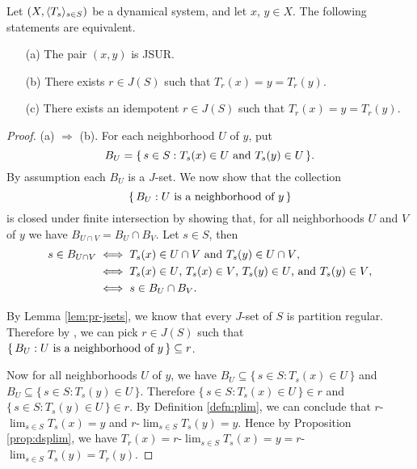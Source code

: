   \begin{lem}
    \label{lem:JSUR}
    Let $(X, \langle T_s \rangle_{s \in S})$ be a dynamical system, and let $x$, $y \in X$.
    The following statements are equivalent.
    \begin{itemize}
      \item[(a)] The pair $(x, y)$ is JSUR.
      \item[(b)] There exists $r \in J(S)$ such that $T_r(x) = y = T_r(y)$.
      \item[(c)] There exists an idempotent $r \in J(S)$ such that $T_r(x)
        = y = T_r(y)$. 
    \end{itemize}
  \end{lem}
  \begin{proof}
    (a) $\Rightarrow$ (b). 
    For each neighborhood $U$ of $y$, put 
      \[  
        B_U = \{\, s \in S : \hbox{$T_s(x) \in U$ and $T_s(y) \in U$}
        \,\}.
      \]
    By assumption each $B_U$ is a $J$-set. 
    We now show that the collection 
    \[
      \{\, B_U : \hbox{$U$ is a neighborhood of $y$} \,\}
    \] 
    is closed under finite intersection
    by showing that, for all neighborhoods $U$ and $V$ of $y$ we have $B_{U
      \cap V} = B_U \cap B_V$.
    Let $s \in S$, then 
      \begin{align*}
        s \in B_{U \cap V} &\iff \hbox{$T_s(x) \in U \cap V$ and $T_s(y) \in U
        \cap V$}, \\
      &\iff \hbox{$T_s(x) \in U$, $T_s(x) \in V$, $T_s(y) \in U$, and
        $T_s(y) \in V$}, \\
      &\iff s \in B_U \cap B_V.
      \end{align*}
    
    By Lemma \ref{lem:pr-jsets}, we know that every $J$-set
    of $S$ is partition regular. 
    Therefore by \cite[Theorem 3.11 (b)]{Hindman:1998fk},  we can pick 
    $r \in J(S)$ such that $\{\, B_U : \hbox{$U$ is a neighborhood of
      $y$}\,\} \subseteq r$. 
    
    Now for all neighborhoods $U$ of $y$, we have $B_U \subseteq \{\,
    s \in S : T_s(x) \in U \,\}$ and $B_U \subseteq \{\, s \in S :
    T_s(y) \in U \,\}$. 
    Therefore $\{\, s \in S : T_s(x) \in U\,\} \in r$ and $\{\, s \in
    S : T_s(y) \in U \,\} \in r$. 
    By Definition \ref{defn:plim}, we can conclude that
    $r$-$\displaystyle\lim_{s\in S} T_s(x) = y$ and
    $r$-$\displaystyle\lim_{s \in S} T_s(y) = y$. 
    Hence by Proposition \ref{prop:dsplim}, we have $T_r(x) =
    r$-$\displaystyle\lim_{s \in S} T_s(x) = y = r$-$\displaystyle\lim_{s \in S}
    T_s(y) = T_r(y)$.
  

\end{proof}
